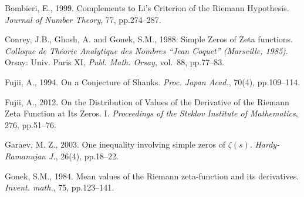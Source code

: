 \documentclass[12pt,a4paper,reqno]{amsart}
\theoremstyle{remark}
\numberwithin{equation}{section}
\begin{document}
\begin{thebibliography}{13}
\providecommand{\natexlab}[1]{#1}
\providecommand{\url}[1]{\texttt{#1}}
\providecommand{\urlprefix}{Available from: }
\providecommand{\urldateprefix}{Accessed }
\providecommand{\selectlanguage}[1]{\relax}
\providecommand{\bibinfo}[2]{#2}
\providecommand{\eprint}[2][]{\url{#2}}

\bibinfo{author}{Bombieri, E.}, \bibinfo{year}{1999}.
\newblock \bibinfo{title}{Complements to {L}i's {C}riterion of the {R}iemann
  {H}ypothesis}.
\newblock \emph{\bibinfo{journal}{Journal of {N}umber {T}heory}},
  \bibinfo{volume}{77}, pp.\bibinfo{pages}{274--287}.

\bibinfo{author}{Conrey, J.B.}, \bibinfo{author}{Ghosh, A.} and
  \bibinfo{author}{Gonek, S.M.}, \bibinfo{year}{1988}.
\newblock \bibinfo{title}{Simple {Z}eros of {Z}eta functions}.
\newblock \emph{\bibinfo{booktitle}{Colloque de {T}h\'eorie {A}nalytique des
  {N}ombres ``{J}ean {C}oquet'' ({M}arseille, 1985)}}.
\newblock \bibinfo{address}{Orsay}: \bibinfo{publisher}{Univ. Paris XI},
  \emph{\bibinfo{series}{Publ. Math. Orsay}}, vol.~\bibinfo{volume}{88},
  pp.\bibinfo{pages}{77--83}.

\bibinfo{author}{Fujii, A.}, \bibinfo{year}{1994}.
\newblock \bibinfo{title}{On a {C}onjecture of {S}hanks}.
\newblock \emph{\bibinfo{journal}{Proc. {J}apan {A}cad.}},
  \bibinfo{volume}{70}(\bibinfo{number}{4}), pp.\bibinfo{pages}{109--114}.

\bibinfo{author}{Fujii, A.}, \bibinfo{year}{2012}.
\newblock \bibinfo{title}{On the {D}istribution of {V}alues of the {D}erivative
  of the {R}iemann {Z}eta {F}unction at {I}ts {Z}eros. {I}}.
\newblock \emph{\bibinfo{journal}{Proceedings of the {S}teklov {I}nstitute of
  {M}athematics}}, \bibinfo{volume}{276}, pp.\bibinfo{pages}{51--76}.

\bibinfo{author}{Garaev, M. Z.}, \bibinfo{year}{2003}.
\newblock \bibinfo{title}{One inequality involving simple zeros of $\zeta (s)$}.
\newblock \emph{\bibinfo{journal}{Hardy-{R}amanujan {J}.}},
\bibinfo{volume}{26}(\bibinfo{number}{4}), pp.\bibinfo{pages}{18--22}.


\bibinfo{author}{Gonek, S.M.}, \bibinfo{year}{1984}.
\newblock \bibinfo{title}{Mean values of the {R}iemann zeta-function and its
  derivatives}.
\newblock \emph{\bibinfo{journal}{Invent. math.}}, \bibinfo{volume}{75},
  pp.\bibinfo{pages}{123--141}.


\end{thebibliography}
\end{document}
